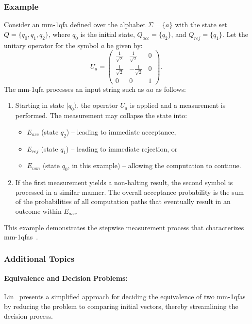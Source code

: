 \subsubsection{Example}
Consider an \gls{mm-1qfa} defined over the alphabet $\Sigma=\{a\}$ with the state set $Q=\{q_0,q_1,q_2\}$, where $q_0$ is the initial state, $Q_{acc}=\{q_2\}$, and $Q_{rej}=\{q_1\}$. Let the unitary operator for the symbol $a$ be given by:
\[
U_a = \begin{pmatrix}
\frac{1}{\sqrt{2}} & \frac{1}{\sqrt{2}} & 0 \\[1mm]
\frac{1}{\sqrt{2}} & -\frac{1}{\sqrt{2}} & 0 \\[1mm]
0 & 0 & 1
\end{pmatrix}.
\]
The \gls{mm-1qfa} processes an input string such as $aa$ as follows:
\begin{enumerate}
    \item Starting in state $|q_0\rangle$, the operator $U_a$ is applied and a measurement is performed. The measurement may collapse the state into:
    \begin{itemize}
        \item $E_{acc}$ (state $q_2$) – leading to immediate acceptance,
        \item $E_{rej}$ (state $q_1$) – leading to immediate rejection, or
        \item $E_{non}$ (state $q_0$, in this example) – allowing the computation to continue.
    \end{itemize}
    \item If the first measurement yields a non-halting result, the second symbol is processed in a similar manner. The overall acceptance probability is the sum of the probabilities of all computation paths that eventually result in an outcome within $E_{acc}$.
\end{enumerate}
This example demonstrates the stepwise measurement process that characterizes \gls{mm-1qfa}s~\cite{646094,LIN2012807}.

\subsubsection{Additional Topics}
\paragraph{Equivalence and Decision Problems:} Lin~\cite{LIN2012807} presents a simplified approach for deciding the equivalence of two \gls{mm-1qfa}s by reducing the problem to comparing initial vectors, thereby streamlining the decision process.

